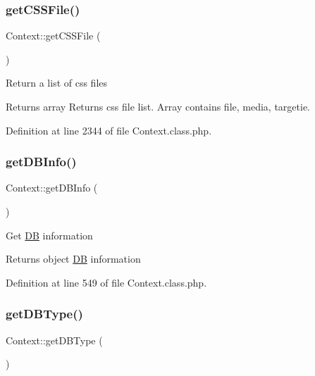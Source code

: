 \subsubsection{\texorpdfstring{get\+C\+S\+S\+File()}{getCSSFile()}}
{\footnotesize\ttfamily Context\+::get\+C\+S\+S\+File (\begin{DoxyParamCaption}{ }\end{DoxyParamCaption})}

Return a list of css files

\begin{DoxyReturn}{Returns}
array Returns css file list. Array contains file, media, targetie. 
\end{DoxyReturn}


Definition at line 2344 of file Context.\+class.\+php.

\mbox{\label{classContext_a54dd61c7b035a12697db8ca3f1c6849c}} 
\subsubsection{\texorpdfstring{get\+D\+B\+Info()}{getDBInfo()}}
{\footnotesize\ttfamily Context\+::get\+D\+B\+Info (\begin{DoxyParamCaption}{ }\end{DoxyParamCaption})}

Get \hyperlink{classDB}{DB} information

\begin{DoxyReturn}{Returns}
object \hyperlink{classDB}{DB} information 
\end{DoxyReturn}


Definition at line 549 of file Context.\+class.\+php.

\mbox{\label{classContext_a2e90e7083bcc220daeec3d4d8d3bb427}} 
\subsubsection{\texorpdfstring{get\+D\+B\+Type()}{getDBType()}}
{\footnotesize\ttfamily Context\+::get\+D\+B\+Type (\begin{DoxyParamCaption}{ }\end{DoxyParamCaption})}

